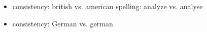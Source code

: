 \documentclass[
]{scrartcl}
\begin{document}
\begin{structure}
  \wordstart
  \emptyV
  \fen

\end{structure}

\section*{\TODO{}}
\begin{itemize}
\item consistency: british vs. american spelling: analyze vs. analyse
\item consistency: German vs. german
\end{itemize}

\printbibliography
\end{document}

